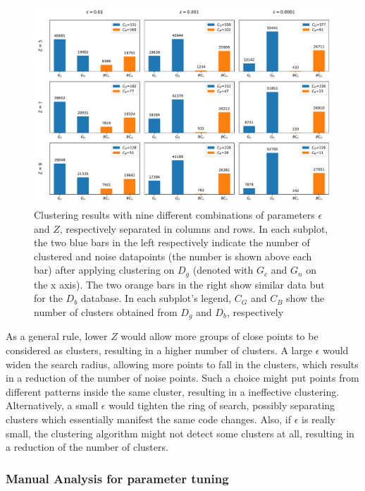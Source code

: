 \begin{figure}[h]
\centering
\includegraphics[width=1\textwidth]{figs/clusters.pdf}
\caption{\label{fig:clustering} Clustering results with nine different combinations of parameters $\epsilon$ and $Z$, respectively separated in columns and rows. In each subplot, the two blue bars in the left respectively indicate the number of clustered and noise datapoints (the number is shown above each bar) after applying clustering on $D_g$ (denoted with $G_c$ and $G_n$ on the x axis). The two orange bars in the right show similar data but for the $D_{b}$ database. In each subplot's legend, $C_G$ and $C_B$ show the number of clusters obtained from $D_g$ and $D_b$, respectively}
\end{figure}

As a general rule, lower $Z$ would allow more groups of close points to be considered as clusters, resulting in a higher number of clusters. A large $\epsilon$ would widen the search radius, allowing more points to fall in the clusters, which results in a reduction of the number of noise points. Such a choice might put points from different patterns inside the same cluster, resulting in a ineffective clustering. Alternatively, a small $\epsilon$ would tighten the ring of search, possibly separating clusters which essentially manifest the same code changes. Also, if $\epsilon$ is really small, the clustering algorithm might not detect some clusters at all, resulting in a reduction of the number of clusters. 

\subsubsection{\label{sec:manual_analysis_parameter_tuning}Manual Analysis for parameter tuning}

